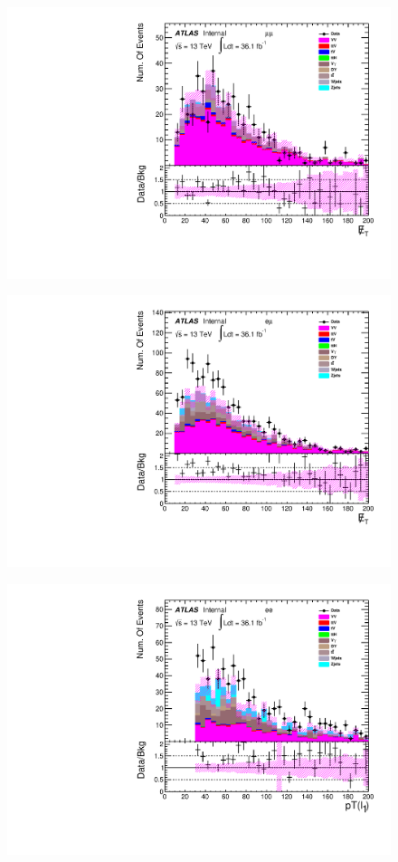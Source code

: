 \begin{figure}[h]
\begin{minipage}[t]{0.3\linewidth}
 \includegraphics[width=1.0\textwidth,angle=-90]{fig/nominal/MET_mumu.pdf}
 \label{fig:nominal:MET_mumu.pdf}
 \end{minipage}
\begin{minipage}[t]{0.3\linewidth}
 \centering
 \includegraphics[width=1.0\textwidth,angle=-90]{fig/nominal/MET_emu.pdf}
 \label{fig:nominal:MET_emu.pdf}
 \end{minipage}
\begin{minipage}[t]{0.3\linewidth}
 \centering
 \includegraphics[width=1.0\textwidth,angle=-90]{fig/nominal/pt_leadinglepton_ee.pdf}

\end{minipage}
\end{figure}
